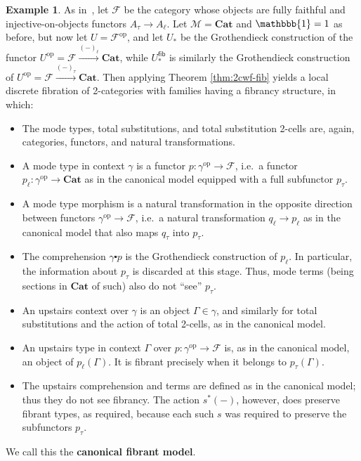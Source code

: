 \documentclass[10pt]{article}
\theoremstyle{definition}
\newtheorem{example}{Example}
\newcommand\St[2]{\ensuremath{{#1}^*(#2)}}
\newcommand\op{^{\mathrm{op}}}
\newcommand\Cat{\mathbf{Cat}}
\newcommand\M{\mathcal{M}}
\newcommand\tight{\tau}
\newcommand\loose{\ell}
\newcommand\one{\mathbbb{1}}
\newcommand\ce{\mathord{\centerdot}}
\newcommand\Un{U}
\newcommand\Ub{U_*}
\newcommand\Ubfib{\Ub^{\mathsf{fib}}}
\newcommand{\sF}{\mathscr{F}}
\begin{document}
\begin{example}
  As in~\cite{lackshulman:laxlim}, let $\sF$ be the category whose objects are fully faithful and injective-on-objects functors $A_\tight \to A_\loose$.
  Let $\M=\Cat$ and $\one=1$ as before, but now let $\Un=\sF\op$, and let $\Ub$ be the Grothendieck construction of the functor $\Un\op = \sF \xrightarrow{(-)_\loose} \Cat$, while $\Ubfib$ is similarly the Grothendieck construction of $\Un\op = \sF \xrightarrow{(-)_\tight} \Cat$.
  Then applying Theorem \ref{thm:2cwf-fib} yields a local discrete fibration of 2-categories with families having a fibrancy structure, in which:
  \begin{itemize}
  \item The mode types, total substitutions, and total substitution 2-cells are, again, categories, functors, and natural transformations.
  \item A mode type in context $\gamma$ is a functor $p : \gamma\op\to\sF$, i.e.\ a functor $p_\loose : \gamma\op\to\Cat$ as in the canonical model equipped with a full subfunctor $p_\tight$.
  \item A mode type morphism is a natural transformation in the opposite direction between functors $\gamma\op\to\sF$, i.e.\ a natural transformation $q_\loose \to p_\loose$ as in the canonical model that also maps $q_\tight$ into $p_\tight$.
  \item The comprehension $\gamma\ce p$ is the Grothendieck construction of $p_\loose$.
    In particular, the information about $p_\tight$ is discarded at this stage.
    Thus, mode terms (being sections in $\Cat$ of such) also do not ``see'' $p_\tight$.
  \item An upstairs context over $\gamma$ is an object $\Gamma\in\gamma$, and similarly for total substitutions and the action of total 2-cells, as in the canonical model.
  \item An upstairs type in context $\Gamma$ over $p:\gamma\op\to\sF$ is, as in the canonical model, an object of $p_\loose(\Gamma)$.
    It is fibrant precisely when it belongs to $p_\tight(\Gamma)$.
  \item The upstairs comprehension and terms are defined as in the canonical model; thus they do not see fibrancy.
    The action $\St{s}{-}$, however, does preserve fibrant types, as required, because each such $s$ was required to preserve the subfunctors $p_\tight$.
  \end{itemize}
  We call this the \textbf{canonical fibrant model}.
\end{example}
\end{document}
